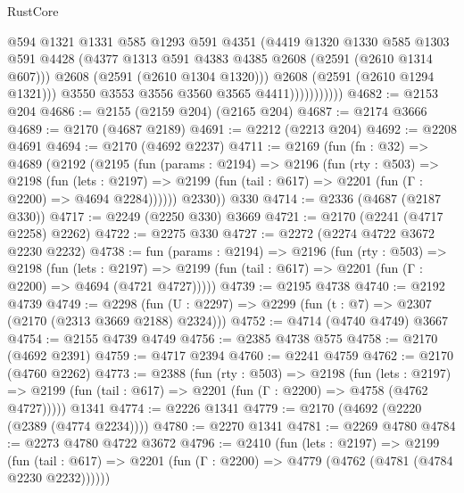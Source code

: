 \begin{lexlean}{RustCore}
\begin{coremodule}
                            @594
                            @1321
                            @1331
                            @585
                            @1293
                            @591
                            @4351
                            (@4419
                              @1320
                              @1330
                              @585
                              @1303
                              @591
                              @4428
                              (@4377 @1313 @591 @4383 @4385 @2608 (@2591 (@2610 @1314 @607)))
                              @2608
                              (@2591 (@2610 @1304 @1320)))
                            @2608
                            (@2591 (@2610 @1294 @1321)))
                          @3550
                          @3553
                          @3556
                          @3560
                          @3565
                          @4411)))))))))))
@4682 := @2153 @204
@4686 := @2155 (@2159 @204) (@2165 @204)
@4687 := @2174 @3666
@4689 := @2170 (@4687 @2189)
@4691 := @2212 (@2213 @204)
@4692 := @2208 @4691
@4694 := @2170 (@4692 @2237)
@4711 := @2169
    (fun (fn : @32) =>
    @4689
      (@2192
        (@2195
          (fun (params : @2194) =>
          @2196
            (fun (rty : @503) =>
            @2198
              (fun (lets : @2197) =>
              @2199 (fun (tail : @617) => @2201 (fun (Γ : @2200) => @4694 @2284))))))
        @2330))
    @330
@4714 := @2336 (@4687 (@2187 @330))
@4717 := @2249 (@2250 @330) @3669
@4721 := @2170 (@2241 (@4717 @2258) @2262)
@4722 := @2275 @330
@4727 := @2272 (@2274 @4722 @3672 @2230 @2232)
@4738 := fun (params : @2194) =>
  @2196
    (fun (rty : @503) =>
    @2198
      (fun (lets : @2197) =>
      @2199 (fun (tail : @617) => @2201 (fun (Γ : @2200) => @4694 (@4721 @4727)))))
@4739 := @2195 @4738
@4740 := @2192 @4739
@4749 := @2298 (fun (U : @2297) => @2299 (fun (t : @7) => @2307 (@2170 (@2313 @3669 @2188) @2324)))
@4752 := @4714 (@4740 @4749) @3667
@4754 := @2155 @4739 @4749
@4756 := @2385 @4738 @575
@4758 := @2170 (@4692 @2391)
@4759 := @4717 @2394
@4760 := @2241 @4759
@4762 := @2170 (@4760 @2262)
@4773 := @2388
    (fun (rty : @503) =>
    @2198
      (fun (lets : @2197) =>
      @2199 (fun (tail : @617) => @2201 (fun (Γ : @2200) => @4758 (@4762 @4727)))))
    @1341
@4774 := @2226 @1341
@4779 := @2170 (@4692 (@2220 (@2389 (@4774 @2234))))
@4780 := @2270 @1341
@4781 := @2269 @4780
@4784 := @2273 @4780 @4722 @3672
@4796 := @2410
    (fun (lets : @2197) =>
    @2199
      (fun (tail : @617) => @2201 (fun (Γ : @2200) => @4779 (@4762 (@4781 (@4784 @2230 @2232))))))

\end{coremodule}
\end{lexlean}
